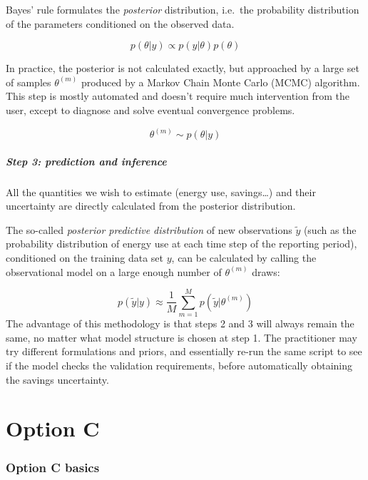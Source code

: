 \documentclass[
]{article}
\begin{document}
Bayes' rule formulates the \emph{posterior} distribution, i.e.~the probability distribution of the parameters conditioned on the observed data.

\[ p(\theta|y) \propto p(y|\theta) p(\theta)\]

In practice, the posterior is not calculated exactly, but approached by a large set of samples \(\theta^{(m)}\) produced by a Markov Chain Monte Carlo (MCMC) algorithm. This step is mostly automated and doesn't require much intervention from the user, except to diagnose and solve eventual convergence problems.

\[\theta^{(m)} \sim p(\theta|y)\]

\hypertarget{step-3-prediction-and-inference}{%
\subsubsection{Step 3: prediction and inference}\label{step-3-prediction-and-inference}}

All the quantities we wish to estimate (energy use, savings\ldots) and their uncertainty are directly calculated from the posterior distribution.

The so-called \emph{posterior predictive distribution} of new observations \(\tilde{y}\) (such as the probability distribution of energy use at each time step of the reporting period), conditioned on the training data set \(y\), can be calculated by calling the observational model on a large enough number of \(\theta^{(m)}\) draws:

\[ p\left(\tilde{y}|y\right) \approx \frac{1}{M} \sum_{m=1}^M p\left(\tilde{y}|\theta^{(m)}\right) \]
The advantage of this methodology is that steps 2 and 3 will always remain the same, no matter what model structure is chosen at step 1. The practitioner may try different formulations and priors, and essentially re-run the same script to see if the model checks the validation requirements, before automatically obtaining the savings uncertainty.

\hypertarget{part-option-c}{%
\part{Option C}\label{part-option-c}}

\hypertarget{option-c-basics}{%
\section{Option C basics}\label{option-c-basics}}
\end{document}
